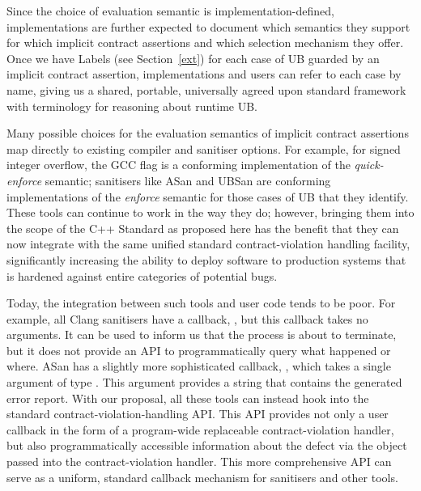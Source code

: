 Since the choice of evaluation semantic is implementation-defined, implementations are further expected to document which semantics they support for which implicit contract assertions and which selection mechanism they offer. Once we have Labels (see Section~\ref{ext}) for each case of UB guarded by an implicit contract assertion, implementations and users can refer to each case by name, giving us a shared, portable, universally agreed upon standard framework with terminology for reasoning about runtime UB.

Many possible choices for the evaluation semantics of implicit contract assertions map directly to existing compiler and sanitiser options. For example, for signed integer overflow, the GCC flag  is a conforming implementation of the \emph{quick-enforce} semantic; sanitisers like ASan and UBSan are conforming implementations of the \emph{enforce} semantic for those cases of UB that they identify. These tools can continue to work in the way they do; however, bringing them into the scope of the C++ Standard as proposed here has the benefit that they can now integrate with the same unified standard contract-violation handling facility, significantly increasing the ability to deploy software to production systems that is hardened against entire categories of potential bugs.

Today, the integration between such tools and user code tends to be poor. For example, all Clang sanitisers have a callback, , but this callback takes no arguments. It can be used to inform us that the process is about to terminate, but it does not provide an API to programmatically query what happened or where. ASan has a slightly more sophisticated callback, , which takes a single argument of type . This argument provides a string that contains the generated error report. With our proposal, all these tools can instead hook into the standard contract-violation-handling API. This API provides not only a user callback in the form of a  program-wide replaceable contract-violation handler, but also programmatically accessible information about the defect via the  \mbox{} object passed into the contract-violation handler. This more comprehensive API can serve as a uniform, standard callback mechanism for sanitisers and other tools.

